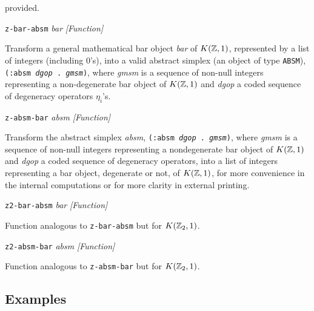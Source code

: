 {{provided. \par}
{\leftskip=5mm
{\tt z-bar-absm} {\em bar}  \hfill {\em [Function]} \par}
{\leftskip=15mm
Transform a general mathematical bar object {\em bar} of $K({{\Bbb Z}}, 1)$, 
represented by a list of integers (including $0$'s),
into a valid abstract simplex (an object of type {\tt ABSM}), {\tt (:absm {\em dgop} . {\em gmsm})},
where {\em gmsm}  is a sequence of non-null integers representing a non-de\-ge\-ne\-ra\-te bar object of
$K({{\Bbb Z}},1)$ and {\em dgop} a coded sequence of degeneracy operators $\eta_i$'s. \par}
{\leftskip=5mm
{\tt z-absm-bar} {\em absm}  \hfill {\em [Function]} \par}
{\leftskip=15mm
Transform the abstract simplex {\em absm},  {\tt (:absm {\em dgop} . {\em gmsm})}, where
{\em gmsm} is a sequence of non-null integers representing a nondegenerate bar object of
$K({{\Bbb Z}},1)$ and {\em dgop} a coded sequence of degeneracy operators, into a list of integers
representing a bar object, degenerate or not, of $K({{\Bbb Z}},1)$, for more convenience in the
internal computations or for more clarity in external printing. \par}
{\leftskip=5mm
{\tt z2-bar-absm} {\em bar}  \hfill {\em [Function]} \par}
{\leftskip=15mm
Function analogous to {\tt z-bar-absm} but for  $K({{\Bbb Z}}_2, 1)$. \par}
{\leftskip=5mm
{\tt z2-absm-bar} {\em absm}  \hfill {\em [Function]} \par}
{\leftskip=15mm
Function analogous to {\tt z-absm-bar} but for  $K({{\Bbb Z}}_2, 1)$. \par}
}

\subsection* {Examples}


